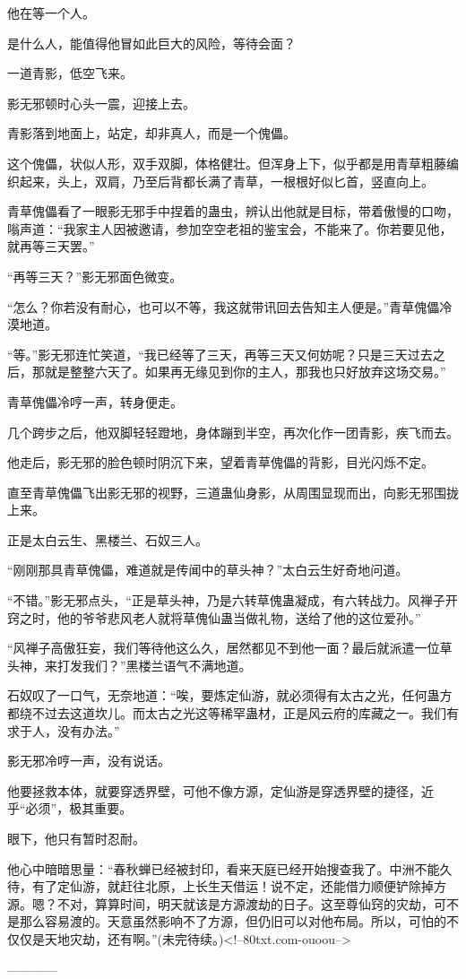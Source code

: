 \begin{this_body}
他在等一个人。

是什么人，能值得他冒如此巨大的风险，等待会面？

一道青影，低空飞来。

影无邪顿时心头一震，迎接上去。

青影落到地面上，站定，却非真人，而是一个傀儡。

这个傀儡，状似人形，双手双脚，体格健壮。但浑身上下，似乎都是用青草粗藤编织起来，头上，双肩，乃至后背都长满了青草，一根根好似匕首，竖直向上。

青草傀儡看了一眼影无邪手中捏着的蛊虫，辨认出他就是目标，带着傲慢的口吻，嗡声道：“我家主人因被邀请，参加空空老祖的鉴宝会，不能来了。你若要见他，就再等三天罢。”

“再等三天？”影无邪面色微变。

“怎么？你若没有耐心，也可以不等，我这就带讯回去告知主人便是。”青草傀儡冷漠地道。

“等。”影无邪连忙笑道，“我已经等了三天，再等三天又何妨呢？只是三天过去之后，那就是整整六天了。如果再无缘见到你的主人，那我也只好放弃这场交易。”

青草傀儡冷哼一声，转身便走。

几个跨步之后，他双脚轻轻蹬地，身体蹦到半空，再次化作一团青影，疾飞而去。

他走后，影无邪的脸色顿时阴沉下来，望着青草傀儡的背影，目光闪烁不定。

直至青草傀儡飞出影无邪的视野，三道蛊仙身影，从周围显现而出，向影无邪围拢上来。

正是太白云生、黑楼兰、石奴三人。

“刚刚那具青草傀儡，难道就是传闻中的草头神？”太白云生好奇地问道。

“不错。”影无邪点头，“正是草头神，乃是六转草傀蛊凝成，有六转战力。风禅子开窍之时，他的爷爷悲风老人就将草傀仙蛊当做礼物，送给了他的这位爱孙。”

“风禅子高傲狂妄，我们等待他这么久，居然都见不到他一面？最后就派遣一位草头神，来打发我们？”黑楼兰语气不满地道。

石奴叹了一口气，无奈地道：“唉，要炼定仙游，就必须得有太古之光，任何蛊方都绕不过去这道坎儿。而太古之光这等稀罕蛊材，正是风云府的库藏之一。我们有求于人，没有办法。”

影无邪冷哼一声，没有说话。

他要拯救本体，就要穿透界壁，可他不像方源，定仙游是穿透界壁的捷径，近乎“必须”，极其重要。

眼下，他只有暂时忍耐。

他心中暗暗思量：“春秋蝉已经被封印，看来天庭已经开始搜查我了。中洲不能久待，有了定仙游，就赶往北原，上长生天借运！说不定，还能借力顺便铲除掉方源。嗯？不对，算算时间，明天就该是方源渡劫的日子。这至尊仙窍的灾劫，可不是那么容易渡的。天意虽然影响不了方源，但仍旧可以对他布局。所以，可怕的不仅仅是天地灾劫，还有啊。”(未完待续。)<!--80txt.com-ouoou-->

------------

\end{this_body}

